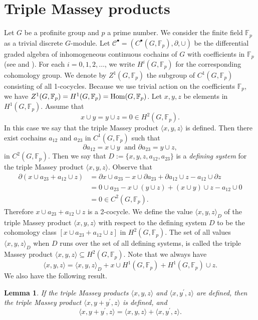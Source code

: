 \documentclass[12pt,leqno]{amsart}
\theoremstyle{plain}
\newtheorem{lem}[thm]{Lemma}
\theoremstyle{definition}
\newcommand{\sC}{{\mathcal C}}
\newcommand{\F}{{\mathbb F}}
\begin{document}
\section{Triple Massey products}
Let $G$ be a profinite group and $p$ a prime number. We consider the finite field $\F_p$ as  a trivial discrete $G$-module. Let $\sC^\bullet=(C^\bullet(G,\F_p),\partial,\cup)$ be the differential graded algebra of inhomogeneous continuous cochains of $G$ with coefficients in $\F_p$ (see \cite[Ch.\ I, \S2]{NSW} and \cite[Section 3]{MT1}). For each $i=0,1,2,\ldots$, we write $H^i(G,\F_p)$ for the corresponding cohomology group. We denote by $Z^1(G,\F_p)$ the subgroup of $C^1(G,\F_p)$ consisting of all 1-cocycles. Because we use  trivial action on the coefficients $\F_p$, we have $Z^1(G,\F_p)=H^1(G,\F_p)={\rm Hom}(G,\F_p)$. Let $x,y,z$ be elements in $H^1(G,\F_p)$. Assume that 
\[
x\cup y=y\cup z=0\in H^2(G,\F_p).
\]
In this case we say that the triple Massey product $\langle x,y,z\rangle$ is defined. Then there exist cochains $a_{12}$ and $a_{23}$ in $C^1(G,\F_p)$ such that
\[
\partial a_{12}=x\cup y \; \text{ and } \partial a_{23}= y\cup z,
\]
in $C^2(G,\F_p)$. Then we say that $D:=\{x,y,z,a_{12},a_{23}\}$  is a {\it defining system} for the triple Massey product $\langle x, y, z\rangle$. Observe that 
\[
\begin{aligned}
\partial (x\cup a_{23}+ a_{12}\cup z) & = \partial x\cup a_{23}-x\cup \partial a_{23}+\partial a_{12}\cup z -a_{12}\cup \partial z\\
&=0 \cup a_{23}-x\cup (y\cup z) +(x\cup y)\cup z - a_{12}\cup 0\\
&=0 \in C^2(G,\F_p).
\end{aligned}
\]
Therefore $x\cup a_{23}+a_{12}\cup z$ is a 2-cocycle. We define the value $\langle x, y, z\rangle_D$ of the triple Massey product $\langle x, y, z\rangle$ with respect to the defining system $D$ to be the cohomology class $[x \cup a_{23}+ a_{12}\cup z]$ in $H^2(G,\F_p)$. The set of all values $\langle x, y, z\rangle_D$ when $D$ runs over the set of all defining systems, is called the triple Massey product $\langle x,y ,z \rangle \subseteq H^2(G,\F_p)$. Note that we always have
\[
\langle x,y ,z \rangle  = \langle x, y, z\rangle_D + x\cup H^1(G,\F_p) + H^1(G,\F_p)\cup z.
\]
We also have the following result.
 \begin{lem}
\label{lem:additivity} 
If the triple Massey products $\langle x,y,z\rangle $  and $\langle x,y^\prime,z\rangle$ are defined, then the triple Massey product $\langle x,y+y^\prime,z\rangle$ is defined, and
\[
\langle x,y+y^\prime,z\rangle=\langle x,y,z\rangle +\langle x,y^\prime,z\rangle.
\]
\end{lem}
\end{document}
